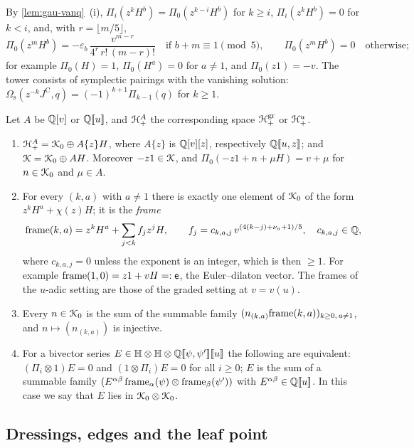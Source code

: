 By \cref{lem:gau-vanq}~(i), $\Pi_i(z^kH^b)=\Pi_0(z^{k-i}H^b)$ for $k\geq i$, $\Pi_i(z^kH^b)=0$ for $k<i$, and, with $r=\lfloor m/5\rfloor$,
\[
\Pi_0(z^mH^b)=-\varepsilon_b\,\frac{v^{m-r}}{4^r\,r!\,(m-r)!}\quad\text{if }b+m\equiv1\pmod5,\qquad\Pi_0(z^mH^b)=0\quad\text{otherwise};
\]
for example $\Pi_0(H)=1$, $\Pi_0(H^a)=0$ for $a\neq1$, and $\Pi_0(z1)=-v$. The tower consists of symplectic pairings with the vanishing solution: $\Omega_{\mathrm s}(z^{-k}J^{\mathrm C},q)=(-1)^{k+1}\Pi_{k-1}(q)$ for $k\geq1$.

\begin{lem}
\label{lem:tra-frames}
Let $A$ be $\mathbb{Q}[v]$ or $\mathbb{Q}[\![ u ]\!]$, and $\mathcal{H}^A_+$ the corresponding space $\mathcal{H}^{\mathrm{gr}}_+$ or $\mathcal{H}^u_+$.
\begin{enumerate}
\item $\mathcal{H}^A_+=\mathcal{K}_{0}\oplus A\{z\}H$, where $A\{z\}$ is $\mathbb{Q}[v][z]$, respectively $\mathbb{Q}[\![ u,z ]\!]$; and $\mathcal{K}=\mathcal{K}_{0}\oplus AH$. Moreover $-z1\in\mathcal{K}$, and $\Pi_0(-z1+n+\mu H)=v+\mu$ for $n\in\mathcal{K}_{0}$ and $\mu\in A$.
\item For every $(k,a)$ with $a\neq1$ there is exactly one element of $\mathcal{K}_{0}$ of the form $z^kH^a+\chi(z)H$; it is the \emph{frame}
\[
\mathrm{frame}(k,a)=z^kH^a+\sum_{j<k}f_jz^jH,\qquad f_j=c_{k,a,j}\,v^{(4(k-j)+\nu_a+1)/5},\quad c_{k,a,j}\in\mathbb{Q},
\]
where $c_{k,a,j}=0$ unless the exponent is an integer, which is then $\geq1$. For example $\mathrm{frame}(1,0)=z1+vH=:\mathsf{e}$, the Euler--dilaton vector. The frames of the $u$-adic setting are those of the graded setting at $v=v(u)$.
\item Every $n\in\mathcal{K}_{0}$ is the sum of the summable family $(n_{(k,a)}\mathrm{frame}(k,a))_{k\geq0,\,a\neq1}$, and $n\mapsto(n_{(k,a)})$ is injective.
\item For a bivector series $E\in\mathbb{H}\otimes\mathbb{H}\otimes\mathbb{Q}[\![ \psi,\psi' ]\!][\![ u ]\!]$ the following are equivalent: $(\Pi_i\otimes1)E=0$ and $(1\otimes\Pi_i)E=0$ for all $i\geq0$; $E$ is the sum of a summable family $(E^{\alpha\beta}\,\mathrm{frame}_\alpha(\psi)\otimes\mathrm{frame}_\beta(\psi'))$ with $E^{\alpha\beta}\in\mathbb{Q}[\![ u ]\!]$. In this case we say that $E$ lies in $\mathcal{K}_{0}\otimes\mathcal{K}_{0}$.
\end{enumerate}
\end{lem}



\subsection{Dressings, edges and the leaf point}
\label{sec:tra-dress}

